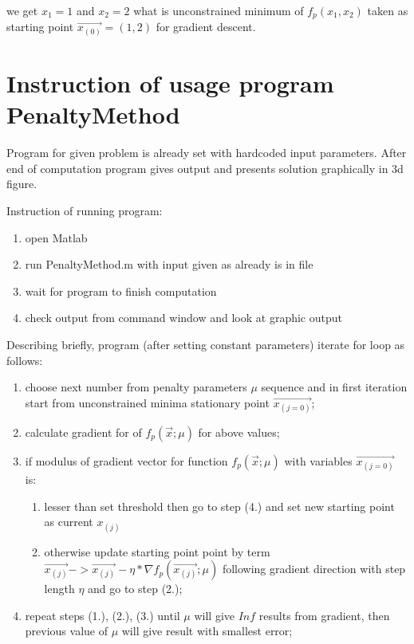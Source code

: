\documentclass[main.tex]{subfiles}
\begin{document}
we get $x_1 = 1$ and $x_2 = 2$ what is unconstrained minimum of $f_p(x_1,x_2)$ taken as starting point $\vec{x_{(0)}}=(1,2)$ for gradient descent.


\newpage
\section{Instruction of usage program PenaltyMethod}

Program for given problem is already set with hardcoded input parameters. After end of computation program gives output and presents solution graphically in 3d figure.



Instruction of running program:
\begin{enumerate}
\item open Matlab
\item run PenaltyMethod.m with input given as already is in file
\item wait for program to finish computation
\item check output from command window and look at graphic output
\end{enumerate}

Describing briefly, program (after setting constant parameters) iterate for loop as follows:

\begin{enumerate}
    \item choose next number from penalty parameters $\mu$ sequence and in first iteration start from unconstrained minima stationary point $\vec{x_{(j=0)}}$;
    \item calculate gradient for of $f_p(\vec{x};\mu)$ for above values;
    \item if modulus of gradient vector for function $f_p(\vec{x};\mu)$ with variables $\vec{x_{(j=0)}}$ is:
    \begin{enumerate}
        \item lesser than set threshold then go to step (4.) and set new starting point as current $x_{(j)}$
        \item otherwise update starting point point by term $\vec{x_{(j)}} -> \vec{x_{(j)}} - \eta*\nabla{f_p(\vec{x_{(j)}};\mu)}$  following gradient direction with step length $\eta$ and go to step (2.);
    \end{enumerate}
    \item repeat steps (1.), (2.), (3.) until $\mu$ will give $Inf$ results from gradient, then previous value of $\mu$ will give result with smallest error;
\end{enumerate}
\end{document}
